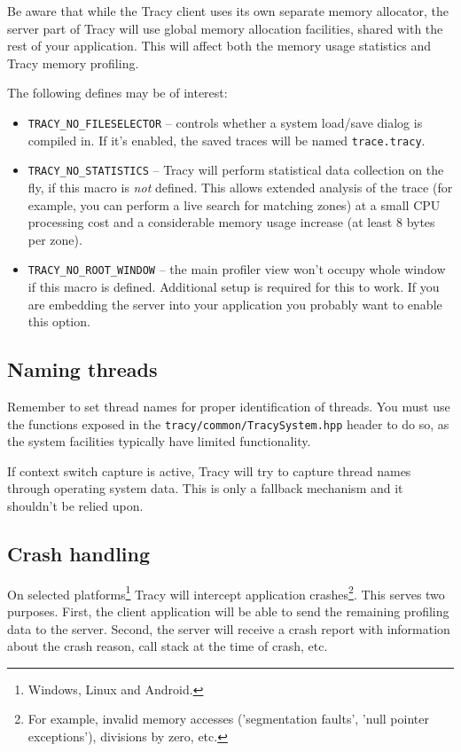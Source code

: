 \documentclass[hidelinks,titlepage,a4paper]{article}
\begin{document}
Be aware that while the Tracy client uses its own separate memory allocator, the server part of Tracy will use global memory allocation facilities, shared with the rest of your application. This will affect both the memory usage statistics and Tracy memory profiling.

The following defines may be of interest:

\begin{itemize}
\item \texttt{TRACY\_NO\_FILESELECTOR} -- controls whether a system load/save dialog is compiled in. If it's enabled, the saved traces will be named \texttt{trace.tracy}.
\item \texttt{TRACY\_NO\_STATISTICS} -- Tracy will perform statistical data collection on the fly, if this macro is \emph{not} defined. This allows extended analysis of the trace (for example, you can perform a live search for matching zones) at a small CPU processing cost and a considerable memory usage increase (at least 8 bytes per zone).
\item \texttt{TRACY\_NO\_ROOT\_WINDOW} -- the main profiler view won't occupy whole window if this macro is defined. Additional setup is required for this to work. If you are embedding the server into your application you probably want to enable this option.
\end{itemize}

\subsection{Naming threads}

Remember to set thread names for proper identification of threads. You must use the functions exposed in the \texttt{tracy/common/TracySystem.hpp} header to do so, as the system facilities typically have limited functionality.

If context switch capture is active, Tracy will try to capture thread names through operating system data. This is only a fallback mechanism and it shouldn't be relied upon.

\subsection{Crash handling}
\label{crashhandling}

On selected platforms\footnote{Windows, Linux and Android.} Tracy will intercept application crashes\footnote{For example, invalid memory accesses ('segmentation faults', 'null pointer exceptions'), divisions by zero, etc.}. This serves two purposes. First, the client application will be able to send the remaining profiling data to the server. Second, the server will receive a crash report with information about the crash reason, call stack at the time of crash, etc.
\end{document}

